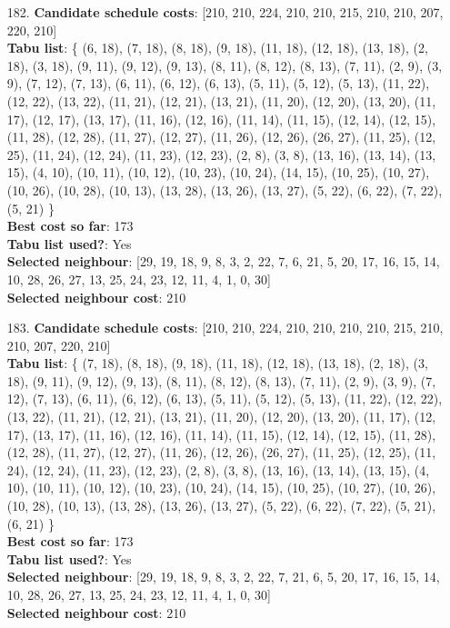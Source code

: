 \documentclass[fleqn]{article}
\begin{document}
\begin{itemize}
    \item[182.] \textbf{Candidate schedule costs}: [210, 210, 224, 210, 210, 215, 210, 210, 207, 220, 210] \\
    \textbf{Tabu list}: \{ (6, 18), (7, 18), (8, 18), (9, 18), (11, 18), (12, 18), (13, 18), (2, 18), (3, 18), (9, 11), (9, 12), (9, 13), (8, 11), (8, 12), (8, 13), (7, 11), (2, 9), (3, 9), (7, 12), (7, 13), (6, 11), (6, 12), (6, 13), (5, 11), (5, 12), (5, 13), (11, 22), (12, 22), (13, 22), (11, 21), (12, 21), (13, 21), (11, 20), (12, 20), (13, 20), (11, 17), (12, 17), (13, 17), (11, 16), (12, 16), (11, 14), (11, 15), (12, 14), (12, 15), (11, 28), (12, 28), (11, 27), (12, 27), (11, 26), (12, 26), (26, 27), (11, 25), (12, 25), (11, 24), (12, 24), (11, 23), (12, 23), (2, 8), (3, 8), (13, 16), (13, 14), (13, 15), (4, 10), (10, 11), (10, 12), (10, 23), (10, 24), (14, 15), (10, 25), (10, 27), (10, 26), (10, 28), (10, 13), (13, 28), (13, 26), (13, 27), (5, 22), (6, 22), (7, 22), (5, 21) \} \\
    \textbf{Best cost so far}: 173 \\
    \textbf{Tabu list used?}: Yes \\
    \textbf{Selected neighbour}: [29, 19, 18, 9, 8, 3, 2, 22, 7, 6, 21, 5, 20, 17, 16, 15, 14, 10, 28, 26, 27, 13, 25, 24, 23, 12, 11, 4, 1, 0, 30] \\
    \textbf{Selected neighbour cost}: 210
      

    \item[183.] \textbf{Candidate schedule costs}: [210, 210, 224, 210, 210, 210, 210, 215, 210, 210, 207, 220, 210] \\
    \textbf{Tabu list}: \{ (7, 18), (8, 18), (9, 18), (11, 18), (12, 18), (13, 18), (2, 18), (3, 18), (9, 11), (9, 12), (9, 13), (8, 11), (8, 12), (8, 13), (7, 11), (2, 9), (3, 9), (7, 12), (7, 13), (6, 11), (6, 12), (6, 13), (5, 11), (5, 12), (5, 13), (11, 22), (12, 22), (13, 22), (11, 21), (12, 21), (13, 21), (11, 20), (12, 20), (13, 20), (11, 17), (12, 17), (13, 17), (11, 16), (12, 16), (11, 14), (11, 15), (12, 14), (12, 15), (11, 28), (12, 28), (11, 27), (12, 27), (11, 26), (12, 26), (26, 27), (11, 25), (12, 25), (11, 24), (12, 24), (11, 23), (12, 23), (2, 8), (3, 8), (13, 16), (13, 14), (13, 15), (4, 10), (10, 11), (10, 12), (10, 23), (10, 24), (14, 15), (10, 25), (10, 27), (10, 26), (10, 28), (10, 13), (13, 28), (13, 26), (13, 27), (5, 22), (6, 22), (7, 22), (5, 21), (6, 21) \} \\
    \textbf{Best cost so far}: 173 \\
    \textbf{Tabu list used?}: Yes \\
    \textbf{Selected neighbour}: [29, 19, 18, 9, 8, 3, 2, 22, 7, 21, 6, 5, 20, 17, 16, 15, 14, 10, 28, 26, 27, 13, 25, 24, 23, 12, 11, 4, 1, 0, 30] \\
    \textbf{Selected neighbour cost}: 210
      


\end{itemize}
\end{document}
